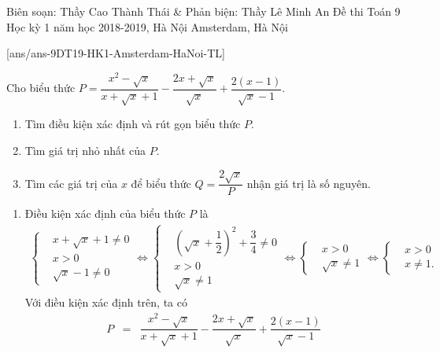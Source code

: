 \begin{name}
{Biên soạn: Thầy Cao Thành Thái \& Phản biện: Thầy Lê Minh An}
{Đề thi Toán 9 Học kỳ 1 năm học 2018-2019, Hà Nội Amsterdam, Hà Nội}
\end{name}

\setcounter{bt}{0}
[ans/ans-9DT19-HK1-Amsterdam-HaNoi-TL]
\begin{bt}%
 Cho biểu thức $P = \dfrac{x^2 - \sqrt{x}}{x + \sqrt{x} + 1} - \dfrac{2x+\sqrt{x}}{\sqrt{x}} + \dfrac{2(x-1)}{\sqrt{x}-1}$.
 \begin{enumerate}
  \item Tìm điều kiện xác định và rút gọn biểu thức $P$.
  \item Tìm giá trị nhỏ nhất của $P$.
  \item Tìm các giá trị của $x$ để biểu thức $Q = \dfrac{2\sqrt{x}}{P}$ nhận giá trị là số nguyên.
 \end{enumerate}
 \loigiai
  {
  \begin{enumerate}
   \item Điều kiện xác định của biểu thức $P$ là
   \begin{align*}
    \left\{\begin{aligned}&x+\sqrt{x}+1 \neq 0 \\&x>0 \\&\sqrt{x}-1 \neq 0\end{aligned}\right. \Leftrightarrow \left\{\begin{aligned}&\left(\sqrt{x}+\dfrac{1}{2}\right)^2+\dfrac{3}{4} \neq 0 \\&x>0 \\&\sqrt{x} \neq 1 \end{aligned}\right. \Leftrightarrow \left\{\begin{aligned}&x>0 \\&\sqrt{x} \neq 1\end{aligned}\right. \Leftrightarrow \left\{\begin{aligned}&x>0 \\&x\neq 1.\end{aligned}\right. \tag{$*$}
   \end{align*}
   Với điều kiện xác định trên, ta có
   \allowdisplaybreaks
   \begin{eqnarray*}
    P &=& \dfrac{x^2 - \sqrt{x}}{x + \sqrt{x} + 1} - \dfrac{2x+\sqrt{x}}{\sqrt{x}} + \dfrac{2(x-1)}{\sqrt{x}-1}\\

\end{eqnarray*}
\end{enumerate}}
\end{bt}
